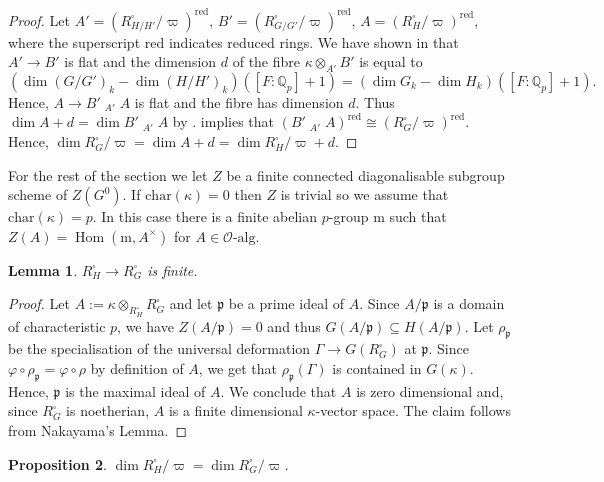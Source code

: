 \documentclass{amsart}
\newtheorem{prop}{Proposition}[section]
\newtheorem{lem}[prop]{Lemma}
\theoremstyle{definition}
\theoremstyle{remark}
\DeclareMathOperator{\Hom}{Hom}
\newcommand{\Qp}{\mathbb {Q}_p}
\newcommand{\OO}{\mathcal O}
\DeclareMathOperator{\wtimes}{\widehat{\otimes}}
\newcommand{\md}{\mathrm m}
\newcommand{\pp}{\mathfrak p}
\newcommand{\alg}{\mathrm{alg}}
\newcommand{\red}{\mathrm{red}}
\newcommand{\chara}{\mathrm{char}}
\begin{document}
\begin{proof} Let $A'= (R^{\square}_{H/H'}/\varpi)^{\red}$, $B'= (R^{\square}_{G/G'}/\varpi)^{\red}$, $A=(R^{\square}_{H}/\varpi)^{\red}$, where the superscript $\red$ indicates
reduced rings. We have shown in \cite[Corollary 9.9]{defT} that 
$A'\rightarrow B'$ is flat and the dimension $d$ of the fibre $\kappa\otimes_{A'} B'$ is equal to
$$(\dim (G/G')_k -\dim (H/H')_k)([F:\Qp]+1)=(\dim G_k-\dim H_k)([F:\Qp]+1).$$
Hence, $A\rightarrow B'\wtimes_{A'} A$ is flat 
and the fibre has dimension $d$. Thus $\dim A+d=\dim B'\wtimes_{A'} A$ by \cite[\href{https://stacks.math.columbia.edu/tag/00ON}{Tag 00ON}]{stacks-project}.  implies that 
$(B'\wtimes_{A'} A)^{\red}\cong (R^{\square}_G/\varpi)^{\red}$. 
Hence, $\dim R^{\square}_G/\varpi = \dim A +d = \dim R^{\square}_H/\varpi +d$. 
\end{proof}



For the rest of the section we let $Z$ be a finite connected diagonalisable subgroup scheme of $Z(G^0)$. If $\chara(\kappa)=0$ then $Z$ is trivial so we assume that 
$\chara(\kappa)=p$. In this case there is a finite abelian $p$-group $\md$ 
such that $Z(A)= \Hom(\md, A^{\times})$ for $A\in \OO\text{-}\alg$. 

\begin{lem}\label{soggy_finite}  $R^{\square}_H \rightarrow R^{\square}_G$ is finite.
\end{lem} 
\begin{proof} Let $A:= \kappa\otimes_{R^{\square}_H} R^{\square}_G$ and let $\pp$ be a prime ideal of 
$A$. Since $A/\pp$ is a domain of characteristic $p$, we have $Z(A/\pp)=0$ and thus 
$G(A/\pp)\subseteq H(A/\pp)$. Let $\rho_{\pp}$ be the specialisation of the universal deformation
$\Gamma \rightarrow G(R^{\square}_G)$ at $\pp$. Since $\varphi\circ \rho_{\pp}= \varphi\circ \rho$ 
by definition of $A$, we get that  $\rho_{\pp}(\Gamma)$ is contained in $G(\kappa)$.
Hence, $\pp$ is the maximal ideal of $A$. We conclude that $A$ is zero dimensional and, since
$R^{\square}_G$ is noetherian, $A$ is a finite dimensional $\kappa$-vector space. The claim 
follows from Nakayama's Lemma. 
\end{proof}

\begin{prop}\label{fin_conn} $\dim R^{\square}_H/\varpi = \dim R^{\square}_G/\varpi$.
\end{prop}
\end{document}
